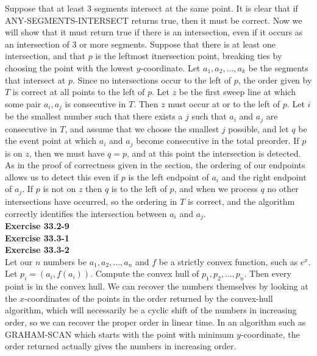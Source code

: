 \documentclass{article}
\begin{document}
Suppose that at least 3 segments intersect at the same point.  It is clear that if ANY-SEGMENTS-INTERSECT returns true, then it must be correct.  Now we will show that it must return true if there is an intersection, even if it occurs as an intersection of 3 or more segments.  Suppose that there is at least one intersection, and that $p$ is the leftmost itnersection point, breaking ties by choosing the point with the lowest $y$-coordinate.  Let $a_1, a_2, \ldots, a_k$ be the segments that intersect at $p$.  Since no intersections occur to the left of $p$, the order given by $T$ is correct at all points to the left of $p$.  Let $z$ be the first sweep line at which some pair $a_i, a_j$ is consecutive in $T$. Then $z$ must occur at or to the left of $p$.  Let $i$ be the smallest number such that there exists a $j$ such that $a_i$ and $a_j$ are consecutive in $T$, and assume that we choose the smallest $j$ possible, and let $q$ be the event point at which $a_i$ and $a_j$ become consecutive in the total preorder.  If $p$ is on $z$, then we must have $q=p$, and at this point the intersection is detected. As in the proof of correctness given in the section, the ordering of our endpoints allows us to detect this even if $p$ is the left endpoint of $a_i$ and the right endpoint of $a_j$.  If $p$ is not on $z$ then $q$ is to the left of $p$, and when we process $q$ no other intersections have occurred, so the ordering in $T$ is correct, and the algorithm correctly identifies the intersection between $a_i$ and $a_j$. \\


\noindent\textbf{Exercise 33.2-9}\\



\noindent\textbf{Exercise 33.3-1}\\

\noindent\textbf{Exercise 33.3-2}\\

Let our $n$ numbers be $a_1, a_2, \ldots, a_n$ and $f$ be a strictly convex function, such as $e^x$.  Let $p_i = (a_i, f(a_i))$.  Compute the convex hull of $p_1, p_2, \ldots, p_n$.  Then every point is in the convex hull.  We can recover the numbers themselves by looking at the $x$-coordinates of the points in the order returned by the convex-hull algorithm, which will necessarily be a cyclic shift of the numbers in increasing order, so we can recover the proper order in linear time.  In an algorithm such as GRAHAM-SCAN which starts with the point with minimum $y$-coordinate, the order returned actually gives the numbers in increasing order.  \\
\end{document}
